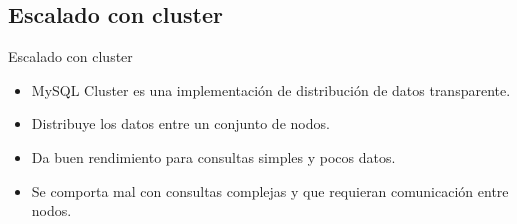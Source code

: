 \subsection{Escalado con cluster}
\begin{frame}{Escalado con cluster}
  \begin{itemize}
    \item MySQL Cluster es una implementación de distribución de datos transparente.
    \item Distribuye los datos entre un conjunto de nodos.
    \item Da buen rendimiento para consultas simples y pocos datos.
    \item Se comporta mal con consultas complejas y que requieran comunicación entre nodos.
  \end{itemize}
\end{frame}
